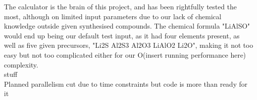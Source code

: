 The calculator is the brain of this project, and has been rightfully tested the most, although on limited input parameters due to our lack of chemical knowledge outside given synthesised compounds. The chemical formula "LiAlSO" would end up being our default test input, as it had four elements present, as well as five given precursors, "Li2S Al2S3 Al2O3 LiAlO2 Li2O", making it not too easy but not too complicated either for our O(insert running performance here) complexity. \\


stuff\\
Planned parallelism cut due to time constraints but code is more than ready for it \\